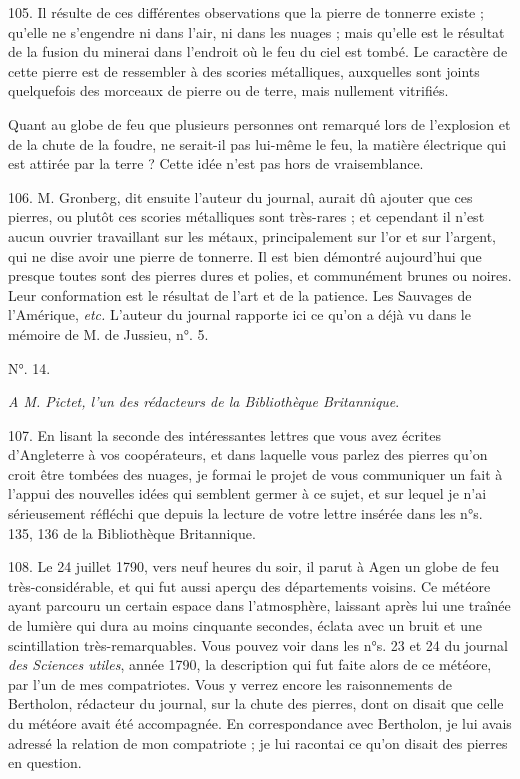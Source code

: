 \documentclass[a4paper, 11pt, oneside, polutonikogreek, french]{article}
\begin{document}
105. Il résulte de ces différentes observations que la pierre de tonnerre existe ; qu'elle ne s'engendre ni dans l'air, ni dans les nuages ; mais qu'elle est le résultat de la fusion du minerai dans l'endroit où le feu du ciel est tombé. Le caractère de cette pierre est de ressembler à des scories métalliques, auxquelles sont joints quelquefois des morceaux de pierre ou de terre, mais nullement vitrifiés.

Quant au globe de feu que plusieurs personnes ont remarqué lors de l'explosion et de la chute de la foudre, ne serait-il pas lui-même le feu, la matière électrique qui est attirée par la terre ? Cette idée n'est pas hors de vraisemblance.

106. M. Gronberg, dit ensuite l'auteur du journal, aurait dû ajouter que ces pierres, ou plutôt ces scories métalliques sont très-rares ; et cependant il n'est aucun ouvrier travaillant sur les métaux, principalement sur l'or et sur l'argent, qui ne dise avoir une pierre de tonnerre. Il est bien démontré aujourd'hui que presque toutes sont des pierres dures et polies, et communément brunes ou noires. Leur conformation est le résultat de l'art et de la patience. Les Sauvages de l'Amérique, \emph{etc.} L'auteur du journal rapporte ici ce qu'on a déjà vu dans le mémoire de M. de Jussieu, n°. 5.

\begin{center}
N°. 14.
\end{center}

\begin{center}
\emph{A M. Pictet, l'un des rédacteurs de la Bibliothèque Britannique}.
\end{center}

107. En lisant la seconde des intéressantes lettres que vous avez écrites d'Angleterre à vos coopérateurs, et dans laquelle vous parlez des pierres qu'on croit être tombées des nuages, je formai le projet de vous communiquer un fait à l'appui des nouvelles idées qui semblent germer à ce sujet, et sur lequel je n'ai sérieusement réfléchi que depuis la lecture de votre lettre insérée dans les n°s. 135, 136 de la Bibliothèque Britannique.

108. Le 24 juillet 1790, vers neuf heures du soir, il parut à Agen un globe de feu très-considérable, et qui fut aussi aperçu des départements voisins. Ce météore ayant parcouru un certain espace dans l'atmosphère, laissant après lui une traînée de lumière qui dura au moins cinquante secondes, éclata avec un bruit et une scintillation très-remarquables. Vous pouvez voir dans les n°s. 23 et 24 du journal \emph{des Sciences utiles}, année 1790, la description qui fut faite alors de ce météore, par l'un de mes compatriotes. Vous y verrez encore les raisonnements de Bertholon, rédacteur du journal, sur la chute des pierres, dont on disait que celle du météore avait été accompagnée. En correspondance avec Bertholon, je lui avais adressé la relation de mon compatriote ; je lui racontai ce qu'on disait des pierres en question.
\end{document}
